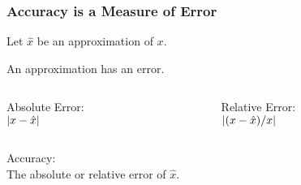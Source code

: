 \begin{frame}

\frametitle{Accuracy is a Measure of Error}

\vspace{\fill}

\begin{center}

Let $\hat{x}$ be an approximation of $x$.

\end{center}

\vspace{\fill}

\begin{center}

An approximation has an error.

\begin{columns}[t]

\begin{column}{0.5\textwidth}

\begin{center}

Absolute Error: \\ ${ \mathopen{} \left| {x-\hat{x}} \right| \mathclose{} }$

\end{center}

\end{column}

\begin{column}{0.5\textwidth}

\begin{center}

Relative Error: \\ ${ \mathopen{} \left| {{ \mathopen{} \left( {x-\hat{x}} \right) \mathclose{} } / \displaystyle x} \right| \mathclose{} }$

\end{center}

\end{column}

\end{columns}

\end{center}

\vspace{\fill}

\begin{center}

Accuracy: \\ The absolute or relative error of $\hat{x}$.

\end{center}

\vspace{\fill}

\end{frame}


